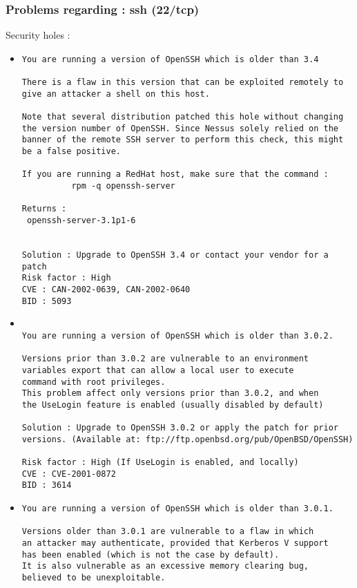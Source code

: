 \documentclass{article}
\begin{document}
\subsubsection{Problems regarding : ssh (22/tcp)}
Security holes :\\
\begin{itemize}
\item \begin{verbatim}
You are running a version of OpenSSH which is older than 3.4

There is a flaw in this version that can be exploited remotely to
give an attacker a shell on this host.

Note that several distribution patched this hole without changing
the version number of OpenSSH. Since Nessus solely relied on the
banner of the remote SSH server to perform this check, this might
be a false positive.

If you are running a RedHat host, make sure that the command :
          rpm -q openssh-server
   
Returns :
 openssh-server-3.1p1-6


Solution : Upgrade to OpenSSH 3.4 or contact your vendor for a patch
Risk factor : High
CVE : CAN-2002-0639, CAN-2002-0640
BID : 5093
\end{verbatim}\item \begin{verbatim}
 
You are running a version of OpenSSH which is older than 3.0.2.

Versions prior than 3.0.2 are vulnerable to an environment
variables export that can allow a local user to execute
command with root privileges.
This problem affect only versions prior than 3.0.2, and when
the UseLogin feature is enabled (usually disabled by default)

Solution : Upgrade to OpenSSH 3.0.2 or apply the patch for prior
versions. (Available at: ftp://ftp.openbsd.org/pub/OpenBSD/OpenSSH)

Risk factor : High (If UseLogin is enabled, and locally)
CVE : CVE-2001-0872
BID : 3614
\end{verbatim}\item \begin{verbatim}
You are running a version of OpenSSH which is older than 3.0.1.

Versions older than 3.0.1 are vulnerable to a flaw in which
an attacker may authenticate, provided that Kerberos V support
has been enabled (which is not the case by default). 
It is also vulnerable as an excessive memory clearing bug, 
believed to be unexploitable.


\end{verbatim}
\end{itemize}
\end{document}
